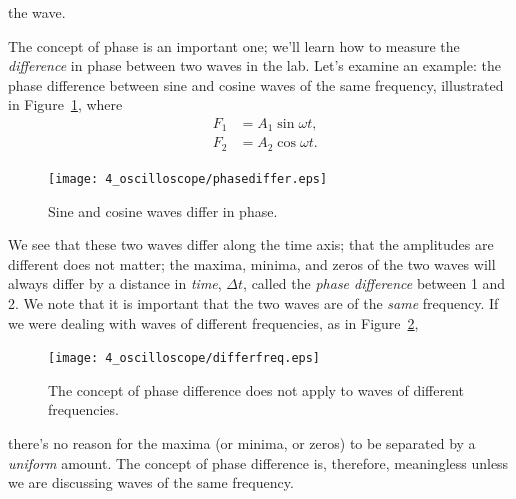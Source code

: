 the wave.

The concept of phase is an important one; we'll learn how to measure the 
{\it difference} in phase between two waves in the lab. Let's examine an 
example: the phase difference between sine and cosine waves of the same 
frequency, 
illustrated in Figure~\ref{fig:scope:phasediffer}, where
\begin{eqnarray*}
& F_1 & =A_1\sin\omega t,  \nonumber \\
& F_2 & = A_2 \cos\omega t.
\end{eqnarray*}
\begin{figure}[htb]
\centering \epsfxsize=8cm \texttt{[image: 4\_oscilloscope/phasediffer.eps]}
\caption{Sine and cosine waves differ in phase.}
\label{fig:scope:phasediffer}
\end{figure}
We see that these two waves differ along the time axis; that the amplitudes
are different does not matter; the maxima, minima, and zeros of the two waves
will always differ by a distance in {\it time}, $\Delta t$, called the 
{\it phase difference} between 1 and 2.  We note that it is important that the 
two waves are of the {\it same} frequency. If we were dealing with waves of 
different frequencies, as in Figure~\ref{fig:scope:differfreq},
\begin{figure}[htb]
\centering \epsfxsize=8cm \texttt{[image: 4\_oscilloscope/differfreq.eps]}
\caption{The concept of phase difference does not apply to waves of different
frequencies.}
\label{fig:scope:differfreq}
\end{figure}
there's no reason for the maxima (or minima, or zeros) to be separated by a 
{\it uniform} amount.  The concept of phase difference is, therefore, 
meaningless unless we are discussing waves of the same frequency.

